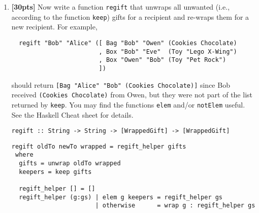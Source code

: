 \documentclass[paper=letter, fontsize=13pt]{article} %
\numberwithin{equation}{section} %
\newif\ifshowanswers\showanswerstrue
\begin{document}
\begin{enumerate}
\newpage
\item \textbf{[30pts]}
  Now write a function \verb|regift| that unwraps all unwanted (i.e., according to the function \verb|keep|) gifts for
  a recipient and re-wraps them for a new recipient.  For example, 
\begin{verbatim}
  regift "Bob" "Alice" ([ Bag "Bob" "Owen" (Cookies Chocolate) 
                        , Box "Bob" "Eve"  (Toy "Lego X-Wing")
                        , Box "Owen" "Bob" (Toy "Pet Rock")
                        ]) 

\end{verbatim}
 should return \verb|[Bag "Alice" "Bob" (Cookies Chocolate)]| since
Bob received \verb|(Cookies Chocolate)| from Owen, but they were not
part of the list returned by \verb|keep|.  You may find the functions
\verb|elem| and/or \verb|notElem| useful. See the Haskell Cheat sheet
for details.

\begin{lstlisting}
regift :: String -> String -> [WrappedGift] -> [WrappedGift]
\end{lstlisting}

\ifshowanswers
\begin{lstlisting}
regift oldTo newTo wrapped = regift_helper gifts
 where
  gifts = unwrap oldTo wrapped
  keepers = keep gifts

  regift_helper [] = []
  regift_helper (g:gs) | elem g keepers = regift_helper gs
                       | otherwise      = wrap g : regift_helper gs
\end{lstlisting} 
\else
  \framebox[0.9\textwidth]{\begin{minipage}[t][40em]{0.9\textwidth} \end{minipage}}
\fi

\end{enumerate}
\newpage
\[ \]
\newpage
\end{document}
